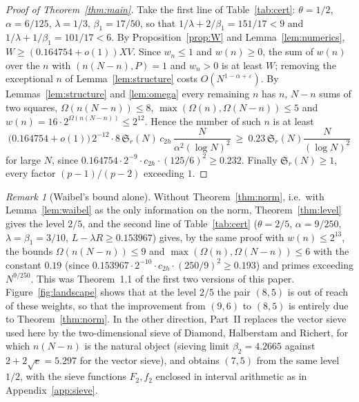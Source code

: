 \documentclass[11pt]{amsart}
\theoremstyle{remark}
\newtheorem{remark}[theorem]{Remark}
\newcommand{\Sg}{\mathfrak{S}}
\newcommand{\e}{\varepsilon}
\begin{document}
\begin{proof}[Proof of Theorem~\ref{thm:main}]
Take the first line of Table~\ref{tab:cert}: $\theta=1/2$, $\alpha=6/125$, $\lambda=1/3$, $\beta_1=17/50$, so that $1/\lambda+2/\beta_1=151/17<9$ and $1/\lambda+1/\beta_1=101/17<6$. By Proposition~\ref{prop:W} and Lemma~\ref{lem:numerics}, $W\ge(0.164754+o(1))XV$. Since $w_n\le1$ and $w(n)\ge0$, the sum of $w(n)$ over the $n$ with $(n(N-n),P)=1$ and $w_n>0$ is at least $W$; removing the exceptional $n$ of Lemma~\ref{lem:structure} costs $O(N^{1-\alpha+\e})$. By Lemmas~\ref{lem:structure} and \ref{lem:omega} every remaining $n$ has $n$, $N-n$ sums of two squares, $\Omega(n(N-n))\le 8$, $\max(\Omega(n),\Omega(N-n))\le5$ and $w(n)=16\cdot2^{\Omega(n(N-n))}\le 2^{12}$. Hence the number of such $n$ is at least
\[
\bigl(0.164754+o(1)\bigr)\,2^{-12}\cdot 8\,\Sg_r(N)\,c_{2h}\,\frac{N}{\alpha^2(\log N)^2}
\ \ge\ 0.23\,\Sg_r(N)\frac{N}{(\log N)^2}
\]
for large $N$, since $0.164754\cdot 2^{-9}\cdot c_{2h}\cdot(125/6)^2\ge0.232$. Finally $\Sg_r(N)\ge1$, every factor $(p-1)/(p-2)$ exceeding $1$.
\end{proof}

\begin{remark}[Waibel's bound alone]\label{rem:half}
Without Theorem~\ref{thm:norm}, i.e.\ with Lemma~\ref{lem:waibel} as the only information on the norm, Theorem~\ref{thm:level} gives the level $2/5$, and the second line of Table~\ref{tab:cert} ($\theta=2/5$, $\alpha=9/250$, $\lambda=\beta_1=3/10$, $L-\lambda R\ge0.153967$) gives, by the same proof with $w(n)\le2^{13}$, the bounds $\Omega(n(N-n))\le9$ and $\max(\Omega(n),\Omega(N-n))\le6$ with the constant $0.19$ (since $0.153967\cdot2^{-10}\cdot c_{2h}\cdot(250/9)^2\ge0.193$) and primes exceeding $N^{9/250}$. This was Theorem~1.1 of the first two versions of this paper. Figure~\ref{fig:landscape} shows that at the level $2/5$ the pair $(8,5)$ is out of reach of these weights, so that the improvement from $(9,6)$ to $(8,5)$ is entirely due to Theorem~\ref{thm:norm}. In the other direction, Part~II \cite[Section~7]{ChenII} replaces the vector sieve used here by the two-dimensional sieve of Diamond, Halberstam and Richert, for which $n(N-n)$ is the natural object (sieving limit $\beta_2=4.2665$ against $2+2\sqrt e=5.297$ for the vector sieve), and obtains $(7,5)$ from the same level $1/2$, with the sieve functions $F_2,f_2$ enclosed in interval arithmetic as in Appendix~\ref{app:sieve}.
\end{remark}

\end{document}
